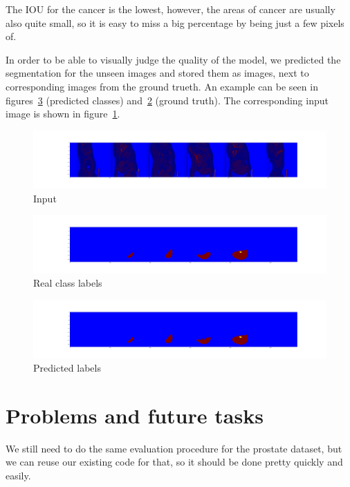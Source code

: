 \documentclass{article}
\begin{document}
		The IOU for the cancer is the lowest, however, the areas of cancer are usually also quite small, so it is easy to miss a big percentage by being just a few pixels of.

		In order to be able to visually judge the quality of the model, we predicted the segmentation for the unseen images and stored them as images, next to corresponding images from the ground trueth. An example can be seen in figures~\ref{fig:pred} (predicted classes) and~\ref{fig:real} (ground truth). The corresponding input image is shown in figure~\ref{fig:inp}.

		\begin{figure}[htbp]
		 	\centering
		 	\includegraphics[width=\textwidth]{input.png}
		 	\caption{Input}
		 	\label{fig:inp}
		 \end{figure} 

		\begin{figure}[htbp]
		 	\centering
		 	\includegraphics[width=\textwidth]{target.png}
		 	\caption{Real class labels}
		 	\label{fig:real}
		 \end{figure} 

		\begin{figure}[htbp]
		 	\centering
		 	\includegraphics[width=\textwidth]{predicted.png}
		 	\caption{Predicted labels}
		 	\label{fig:pred}
		 \end{figure} 


	\section{Problems and future tasks}

		We still need to do the same evaluation procedure for the prostate dataset, but we can reuse our existing code for that, so it should be done pretty quickly and easily.
\end{document}
